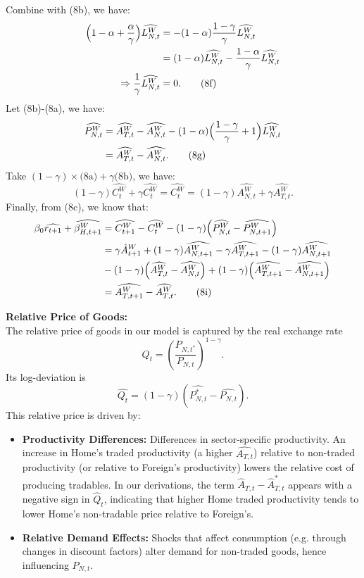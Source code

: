 \documentclass[a4paper,12pt]{article} %
\theoremstyle{nonitalic}
\begin{document}
Combine with (8b), we have:
\begin{align*}
    \Bigl(1 - \alpha + \frac{\alpha}{\gamma} \Bigr)  \widehat{L_{N,t}^W} &= -(1-\alpha) \frac{1-\gamma}{\gamma}  \widehat{L_{N,t}^W} \\
    &= (1-\alpha)  \widehat{L_{N,t}^W} - \frac{1-\alpha}{\gamma}  \widehat{L_{N,t}^W} \\
    \Rightarrow \frac{1}{\gamma}  \widehat{L_{N,t}^W} &= 0. \tag{8f}
\end{align*}
Let (8b)-(8a), we have:
\begin{align*}
     \widehat{P_{N,t}^W} &=  \widehat{A_{T,t}^W} -  \widehat{A_{N,t}^W} - (1-\alpha)\Bigl(\frac{1-\gamma}{\gamma} + 1\Bigr)  \widehat{L_{N,t}^W} \\
    &=  \widehat{A_{T,t}^W} -  \widehat{A_{N,t}^W}. \tag{8g}
\end{align*}
Take $(1-\gamma) \times \text{(8a)} + \gamma \text{(8b)}$, we have:
\[
(1-\gamma)  \widehat{C_t^W} + \gamma  \widehat{C_t^W} =  \widehat{C_t^W} = (1-\gamma)  \widehat{A_{N,t}^W} + \gamma  \widehat{A_{T,t}^W}. \tag{8h}
\]
Finally, from (8c), we know that:
\begin{align*}
    \beta_0  \widehat{r_{t+1}} + \widehat{\beta_{H, t+1}^W} &=  \widehat{C_{t+1}^W} -  \widehat{C_t^W} - (1-\gamma)\Bigl( \widehat{P_{N,t}^W} - \widehat{P_{N, t+1}^W}\Bigr) \\
    &= \gamma \hat{A}_{t+1}^W + (1-\gamma)  \widehat{A_{N,t+1}^W} - \gamma  \widehat{A_{T,t+1}^W} - (1-\gamma)  \widehat{A_{N,t+1}^W} \\
    \quad \quad &- (1-\gamma)\Bigl( \widehat{A_{T,t}^W} -  \widehat{A_{N,t}^W}\Bigr) + (1-\gamma) \Bigl( \widehat{A_{T,t+1}^W} - \widehat{A_{N, t+1}^W} \Bigr) \\
    &= \widehat{A_{T, t+1}^W} -  \widehat{A_{T,t}^W}. \tag{8i}
\end{align*}

\textbf{Relative Price of Goods:}\\
The relative price of goods in our model is captured by the real exchange rate
\[
Q_t = \left(\frac{P_{N,t^*}}{P_{N,t}}\right)^{1-\gamma}.
\]
Its log-deviation is
\[
\widehat{Q_t} = (1-\gamma)(\widehat{P_{N,t}^*}-\widehat{P_{N,t}}).
\]
This relative price is driven by:
\begin{itemize}
    \item \textbf{Productivity Differences:} Differences in sector-specific productivity. An increase in Home's traded productivity (a higher \( \widehat{A_{T,t}} \)) relative to non-traded productivity (or relative to Foreign's productivity) lowers the relative cost of producing tradables. In our derivations, the term \( \widehat{A}_{T,t} - \widehat{A}^*_{T,t} \) appears with a negative sign in \( \widehat{Q}_t \), indicating that higher Home traded productivity tends to lower Home's non-tradable price relative to Foreign's.
    \item \textbf{Relative Demand Effects:} Shocks that affect consumption (e.g. through changes in discount factors) alter demand for non-traded goods, hence influencing \( P_{N,t} \).
\end{itemize}
\end{document}
